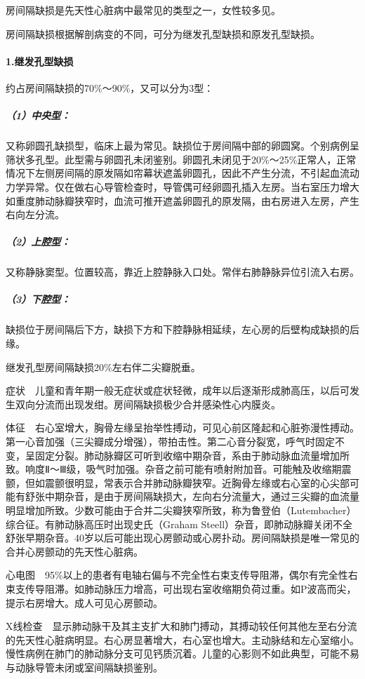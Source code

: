 房间隔缺损是先天性心脏病中最常见的类型之一，女性较多见。

房间隔缺损根据解剖病变的不同，可分为继发孔型缺损和原发孔型缺损。

\paragraph{1.继发孔型缺损}

约占房间隔缺损的70\%～90\%，又可以分为3型：

\subparagraph{（1）中央型：}

又称卵圆孔缺损型，临床上最为常见。缺损位于房间隔中部的卵圆窝。个别病例呈筛状多孔型。此型需与卵圆孔未闭鉴别。卵圆孔未闭见于20\%～25\%正常人，正常情况下左侧房间隔的原发隔如帘幕状遮盖卵圆孔，因此不产生分流，不引起血流动力学异常。仅在做右心导管检查时，导管偶可经卵圆孔插入左房。当右室压力增大如重度肺动脉瓣狭窄时，血流可推开遮盖卵圆孔的原发隔，由右房进入左房，产生右向左分流。

\subparagraph{（2）上腔型：}

又称静脉窦型。位置较高，靠近上腔静脉入口处。常伴右肺静脉异位引流入右房。

\subparagraph{（3）下腔型：}

缺损位于房间隔后下方，缺损下方和下腔静脉相延续，左心房的后壁构成缺损的后缘。

继发孔型房间隔缺损20\%左右伴二尖瓣脱垂。

症状　儿童和青年期一般无症状或症状轻微，成年以后逐渐形成肺高压，以后可发生双向分流而出现发绀。房间隔缺损极少合并感染性心内膜炎。

体征　右心室增大，胸骨左缘呈抬举性搏动，可见心前区隆起和心脏弥漫性搏动。第一心音加强（三尖瓣成分增强），带拍击性。第二心音分裂宽，呼气时固定不变，呈固定分裂。肺动脉瓣区可听到收缩中期杂音，系由于肺动脉血流量增加所致。响度Ⅱ～Ⅲ级，吸气时加强。杂音之前可能有喷射附加音。可能触及收缩期震颤，但如震颤很明显，常表示合并肺动脉瓣狭窄。近胸骨左缘或右心室的心尖部可能有舒张中期杂音，是由于房间隔缺损大，左向右分流量大，通过三尖瓣的血流量明显增加所致。少数可能由于合并二尖瓣狭窄所致，称为鲁登伯（Lutembacher）综合征。有肺动脉高压时出现史氏（Graham
Steell）杂音，即肺动脉瓣关闭不全舒张早期杂音。40岁以后可能出现心房颤动或心房扑动。房间隔缺损是唯一常见的合并心房颤动的先天性心脏病。

心电图　95\%以上的患者有电轴右偏与不完全性右束支传导阻滞，偶尔有完全性右束支传导阻滞。如肺动脉压力增高，可出现右室收缩期负荷过重。如P波高而尖，提示右房增大。成人可见心房颤动。

X线检查　显示肺动脉干及其主支扩大和肺门搏动，其搏动较任何其他左至右分流的先天性心脏病明显。右心房显著增大，右心室也增大。主动脉结和左心室缩小。慢性病例在肺门的肺动脉分支可见钙质沉着。儿童的心影则不如此典型，可能不易与动脉导管未闭或室间隔缺损鉴别。

